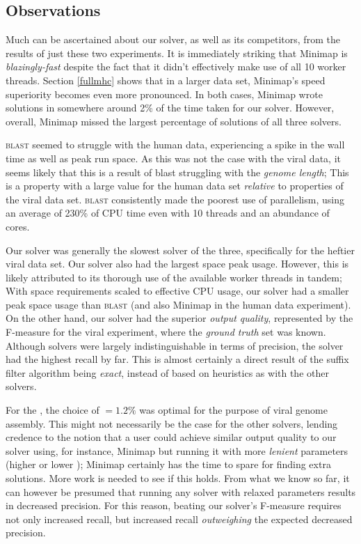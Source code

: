 \subsection{Observations}

Much can be ascertained about our \aspop{} solver, as well as its competitors, from the results of just these two experiments. It is immediately striking that Minimap is \textit{blazingly-fast} despite the fact that it didn't effectively make use of all 10 worker threads. Section \ref{fullmhc} shows that in a larger data set, Minimap's speed superiority becomes even more pronounced. In both cases, Minimap wrote \glspl{solution} in somewhere around 2\% of the time taken for our \aspop{} solver. However, overall, Minimap missed the largest percentage of solutions of all three solvers.

\textsc{blast} seemed to struggle with the human data, experiencing a spike in the wall time as well as peak run space. As this was not the case with the viral data, it seems likely that this is a result of blast struggling with the \textit{genome length}; This is a property with a large value for the human data set \textit{relative} to properties of the viral data set. \textsc{blast} consistently made the poorest use of parallelism, using an average of 230\% of CPU time even with 10 threads and an abundance of cores.

Our \aspop{} solver was generally the slowest solver of the three, specifically for the heftier viral data set. Our \aspop{} solver also had the largest space peak usage. However,  this is likely attributed to its thorough use of the available worker threads in tandem; With space requirements scaled to effective CPU usage, our solver had a smaller peak space usage than \textsc{blast} (and also Minimap in the human data experiment). On the other hand, our solver had the superior \textit{output quality}, represented by the F-measure for the viral experiment, where the \textit{ground truth} set was known. Although solvers were largely indistinguishable in terms of precision, the \aspop{} solver had the highest recall by far. This is almost certainly a direct result of the \gls{suffix filter} algorithm being \textit{exact}, instead of based on heuristics as with the other solvers.

For the \aspop{}, the choice of $=1.2\%$ was optimal for the purpose of viral genome assembly. This might not necessarily be the case for the other solvers, lending credence to the notion that a user could achieve similar output quality to our solver using, for instance, Minimap but running it with more \textit{lenient} parameters (higher  or lower ); Minimap certainly has the time to spare for finding extra solutions. More work is needed to see if this holds. From what we know so far, it can however be presumed that running any solver with relaxed parameters results in decreased precision. For this reason, beating our solver's F-measure requires not only increased recall, but increased recall \textit{outweighing} the expected decreased precision.










